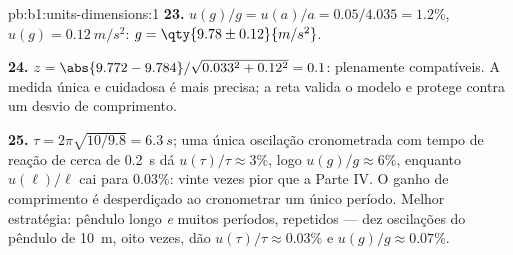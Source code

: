 \begin{solution}{pb:b1:units-dimensions:1}
\textbf{23.} $u(g)/g = u(a)/a = 0.05/4.035 = 1.2\%$, $u(g) =
\qty{0.12}{m/s^2}$: $g = \qty{9.78\pm0.12}{m/s^2}$.

\textbf{24.} $z = \abs{9.772 - 9.784}/\sqrt{0.033^2 + 0.12^2} = 0.1$:
plenamente compatíveis. A medida única e cuidadosa é mais precisa; a
reta valida o modelo e protege contra um desvio de comprimento.

\textbf{25.} $\tau = 2\pi\sqrt{10/9.8} = \qty{6.3}{s}$; uma única
oscilação cronometrada com tempo de reação de cerca de \qty{0.2}{s} dá
$u(\tau)/\tau \approx
3\%$, logo $u(g)/g \approx 6\%$, enquanto
$u(\ell)/\ell$ cai para $0.03\%$: vinte vezes pior que a Parte IV. O ganho
de comprimento é desperdiçado ao cronometrar um único período. Melhor
estratégia: pêndulo longo \emph{e} muitos períodos, repetidos --- dez
oscilações do pêndulo de \qty{10}{m}, oito vezes, dão
$u(\tau)/\tau \approx 0.03\%$ e $u(g)/g \approx 0.07\%$.
\end{solution}
